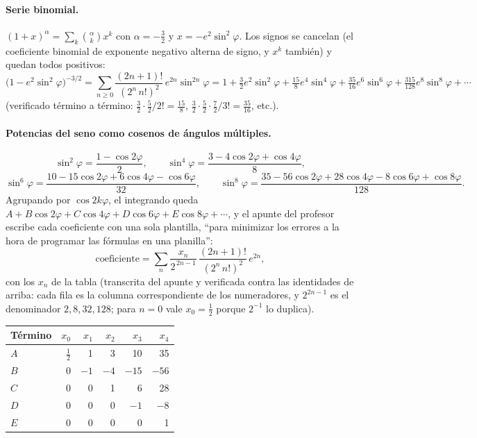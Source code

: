 \paragraph{Serie binomial.} \((1+x)^\alpha=\sum_k\binom{\alpha}{k}x^k\) con
\(\alpha=-\tfrac32\) y \(x=-e^2\sin^2\varphi\). Los signos se cancelan (el coeficiente
binomial de exponente negativo alterna de signo, y \(x^k\) también) y quedan todos
positivos:
\[
  \bigl(1-e^2\sin^2\varphi\bigr)^{-3/2}
  =\sum_{n\ge0}\frac{(2n+1)!}{(2^n\,n!)^2}\,e^{2n}\sin^{2n}\varphi
  =1+\tfrac32e^2\sin^2\varphi+\tfrac{15}8e^4\sin^4\varphi+\tfrac{35}{16}e^6\sin^6\varphi
  +\tfrac{315}{128}e^8\sin^8\varphi+\cdots
\]
(verificado término a término: \(\tfrac32\cdot\tfrac52/2!=\tfrac{15}8\),
\(\tfrac32\cdot\tfrac52\cdot\tfrac72/3!=\tfrac{35}{16}\), etc.).

\paragraph{Potencias del seno como cosenos de ángulos múltiples.}
\[
  \sin^2\varphi=\frac{1-\cos2\varphi}2,\qquad
  \sin^4\varphi=\frac{3-4\cos2\varphi+\cos4\varphi}8,
\]
\[
  \sin^6\varphi=\frac{10-15\cos2\varphi+6\cos4\varphi-\cos6\varphi}{32},\qquad
  \sin^8\varphi=\frac{35-56\cos2\varphi+28\cos4\varphi-8\cos6\varphi+\cos8\varphi}{128}.
\]
Agrupando por \(\cos2k\varphi\), el integrando queda
\(A+B\cos2\varphi+C\cos4\varphi+D\cos6\varphi+E\cos8\varphi+\cdots\), y el apunte del
profesor escribe cada coeficiente con una sola plantilla, ``para minimizar los errores a la
hora de programar las fórmulas en una planilla'':
\[
  \text{coeficiente}=\sum_{n}\frac{x_n}{2^{\,2n-1}}\,\frac{(2n+1)!}{(2^n\,n!)^2}\,e^{2n},
\]
con los \(x_n\) de la tabla (transcrita del apunte y verificada contra las identidades de
arriba: cada fila es la columna correspondiente de los numeradores, y \(2^{2n-1}\) es el
denominador \(2,8,32,128\); para \(n=0\) vale \(x_0=\tfrac12\) porque \(2^{-1}\) lo
duplica).

{\small
\begin{center}
\begin{tabular}{l rrrrr}
\toprule
Término & \(x_0\) & \(x_1\) & \(x_2\) & \(x_3\) & \(x_4\)\\
\midrule
\(A\) & \(\tfrac12\) & 1 & 3 & 10 & 35\\
\(B\) & 0 & \(-1\) & \(-4\) & \(-15\) & \(-56\)\\
\(C\) & 0 & 0 & 1 & 6 & 28\\
\(D\) & 0 & 0 & 0 & \(-1\) & \(-8\)\\
\(E\) & 0 & 0 & 0 & 0 & 1\\
\bottomrule
\end{tabular}
\end{center}
}

